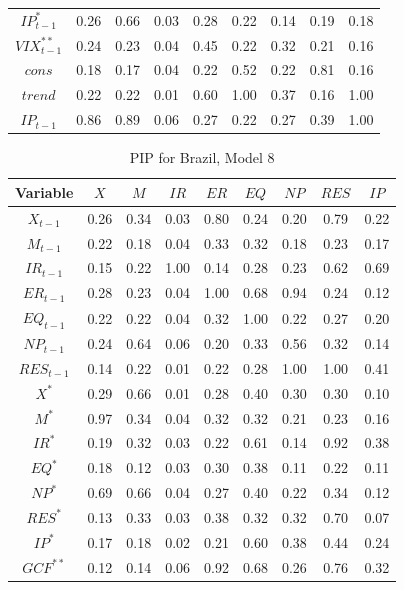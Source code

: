 \documentclass[a4paper, twoside]{templates/ociamthesis}
\begin{document}
\begin{table}[!ht]
\begin{tabular}[t]{ccccccccc}
$IP^*_{t-1}$ & 0.26 & 0.66 & 0.03 & 0.28 & 0.22 & 0.14 & 0.19 & 0.18\\
$VIX^{**}_{t-1}$ & 0.24 & 0.23 & 0.04 & 0.45 & 0.22 & 0.32 & 0.21 & 0.16\\
$cons$ & 0.18 & 0.17 & 0.04 & 0.22 & 0.52 & 0.22 & 0.81 & 0.16\\
$trend$ & 0.22 & 0.22 & 0.01 & 0.60 & 1.00 & 0.37 & 0.16 & 1.00\\
$IP_{t-1}$ & 0.86 & 0.89 & 0.06 & 0.27 & 0.22 & 0.27 & 0.39 & 1.00\\
\bottomrule
\end{tabular}
\end{table}

\begin{table}[!ht]

\caption{\label{tab:TablePIPBR8}PIP for Brazil, Model 8}
\centering
\fontsize{7}{9}\selectfont
\begin{tabular}[t]{ccccccccc}
\toprule
Variable & $X$ & $M$ & $IR$ & $ER$ & $EQ$ & $NP$ & $RES$ & $IP$\\
\midrule
$X_{t-1}$ & 0.26 & 0.34 & 0.03 & 0.80 & 0.24 & 0.20 & 0.79 & 0.22\\
$M_{t-1}$ & 0.22 & 0.18 & 0.04 & 0.33 & 0.32 & 0.18 & 0.23 & 0.17\\
$IR_{t-1}$ & 0.15 & 0.22 & 1.00 & 0.14 & 0.28 & 0.23 & 0.62 & 0.69\\
$ER_{t-1}$ & 0.28 & 0.23 & 0.04 & 1.00 & 0.68 & 0.94 & 0.24 & 0.12\\
$EQ_{t-1}$ & 0.22 & 0.22 & 0.04 & 0.32 & 1.00 & 0.22 & 0.27 & 0.20\\
$NP_{t-1}$ & 0.24 & 0.64 & 0.06 & 0.20 & 0.33 & 0.56 & 0.32 & 0.14\\
$RES_{t-1}$ & 0.14 & 0.22 & 0.01 & 0.22 & 0.28 & 1.00 & 1.00 & 0.41\\
$X^*$ & 0.29 & 0.66 & 0.01 & 0.28 & 0.40 & 0.30 & 0.30 & 0.10\\
$M^*$ & 0.97 & 0.34 & 0.04 & 0.32 & 0.32 & 0.21 & 0.23 & 0.16\\
$IR^*$ & 0.19 & 0.32 & 0.03 & 0.22 & 0.61 & 0.14 & 0.92 & 0.38\\
$EQ^*$ & 0.18 & 0.12 & 0.03 & 0.30 & 0.38 & 0.11 & 0.22 & 0.11\\
$NP^*$ & 0.69 & 0.66 & 0.04 & 0.27 & 0.40 & 0.22 & 0.34 & 0.12\\
$RES^*$ & 0.13 & 0.33 & 0.03 & 0.38 & 0.32 & 0.32 & 0.70 & 0.07\\
$IP^*$ & 0.17 & 0.18 & 0.02 & 0.21 & 0.60 & 0.38 & 0.44 & 0.24\\
$GCF^{**}$ & 0.12 & 0.14 & 0.06 & 0.92 & 0.68 & 0.26 & 0.76 & 0.32\\

\end{tabular}
\end{table}
\end{document}
